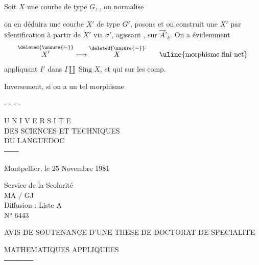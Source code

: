 Soit $X$ une courbe de type $G$, , on normalise

on  en déduira une courbe $X'$ de type $G'$, posons
et on construit une $X'$ par identification à partir de $\widetilde X'$ via $\sigma'$, agissant , sur $\vec A'_k$. On a évidemment
\[
\overset{\deleted{\unsure{\sim}}}{X'}\longrightarrow\overset{\deleted{\unsure{\sim}}}{X}
\qquad\uline{\text{morphisme fini net}}
\]
appliquant $I'$ dans $I\amalg\operatorname{Sing}X$, et qui sur les  comp.  

Inversement, si on a un tel morphisme

\noindent - - - -

\vfill
{}
U N I V E R S I T E\\
DES SCIENCES ET TECHNIQUES\\
DU LANGUEDOC\\
\texttt{------------}

Montpellier, le 25 Novembre 1981

Service de la Scolarité\\
MA / GJ\\
Diffusion : Liste A\\
N° 6443

AVIS DE SOUTENANCE D'UNE THESE DE DOCTORAT DE SPECIALITE

MATHEMATIQUES APPLIQUEES\\
\texttt{------------------------}

